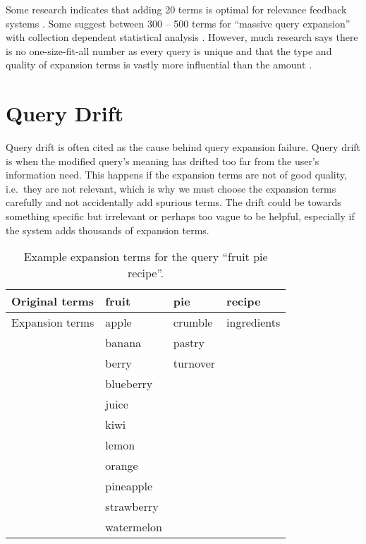 Some research indicates that adding 20 terms is optimal for relevance feedback systems \cite{harman1992relevance}. Some suggest between 300 – 500 terms for ``massive query expansion'' with collection dependent statistical analysis \cite{buckley1995automatic}. However, much research says there is no one-size-fit-all number as every query is unique \cite{billerbeck2004questioning} and that the type and quality of expansion terms is vastly more influential than the amount \cite{sihvonen2004subject}.







\section{Query Drift} \label{sec:querydrift}
Query drift is often cited as the cause behind query expansion failure. Query drift is when the modified query's meaning has drifted too far from the user's information need. This happens if the expansion terms are not of good quality, i.e.\ they are not relevant, which is why we must choose the expansion terms carefully and not accidentally add spurious terms. The drift could be towards something specific but irrelevant or perhaps too vague to be helpful, especially if the system adds thousands of expansion terms.

\begin{table}
    \centering
    \begin{tabular}{|l|lll|}
    \hline
    Original terms  & fruit     & pie     & recipe      \\ \hline
    Expansion terms & apple     & crumble  & ingredients \\
                    & banana    & pastry  &             \\
                    & berry     & turnover &             \\
                    & blueberry &         &             \\
                    & juice     &         &             \\
                    & kiwi      &         &             \\
                    & lemon     &         &             \\
                    & orange    &         &             \\
                    & pineapple &         &             \\
                    & strawberry    &       &           \\
                    & watermelon    &       &           \\
                    \hline
    \end{tabular}
    \caption{Example expansion terms for the query ``fruit pie recipe''.}
    \label{table:querydrift}
\end{table}

